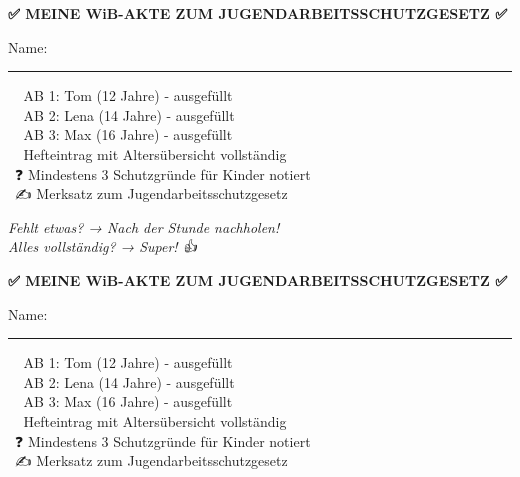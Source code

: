 \documentclass[12pt, a4paper]{article}
\newcommand{\checkbox}{\framebox[1em]{\phantom{X}}}
\begin{document}
    
    \begin{center}
        \begin{minipage}{0.48\textwidth}
            \begin{framed}
                \begin{center}
                    {\color{headercolor}\Large\textbf{✅ MEINE WiB-AKTE ZUM JUGENDARBEITSSCHUTZGESETZ ✅}}
                \end{center}
Name: \rule{8cm}{0.4pt}
                
                \vspace{0.3cm}
                
                \checkbox\ 📄 AB 1: Tom (12 Jahre) - ausgefüllt\\
                \checkbox\ 📄 AB 2: Lena (14 Jahre) - ausgefüllt\\
                \checkbox\ 📄 AB 3: Max (16 Jahre) - ausgefüllt\\
                \checkbox\ 📝 Hefteintrag mit Altersübersicht vollständig\\
                \checkbox\ ❓ Mindestens 3 Schutzgründe für Kinder notiert\\
                \checkbox\ ✍️ Merksatz zum Jugendarbeitsschutzgesetz
                
                \vspace{0.3cm}
                
                \textit{Fehlt etwas? → Nach der Stunde nachholen!}\\
                \textit{Alles vollständig? → Super! 👍}
            \end{framed}
        \end{minipage}
        \hfill
        \begin{minipage}{0.48\textwidth}
            \begin{framed}
                \begin{center}
                    {\color{headercolor}\Large\textbf{✅ MEINE WiB-AKTE ZUM JUGENDARBEITSSCHUTZGESETZ ✅}}
                \end{center}
                
                Name: \rule{8cm}{0.4pt}
                
                \vspace{0.3cm}
                
                \checkbox\ 📄 AB 1: Tom (12 Jahre) - ausgefüllt\\
                \checkbox\ 📄 AB 2: Lena (14 Jahre) - ausgefüllt\\
                \checkbox\ 📄 AB 3: Max (16 Jahre) - ausgefüllt\\
                \checkbox\ 📝 Hefteintrag mit Altersübersicht vollständig\\
                \checkbox\ ❓ Mindestens 3 Schutzgründe für Kinder notiert\\
                \checkbox\ ✍️ Merksatz zum Jugendarbeitsschutzgesetz
                

\end{framed}
\end{minipage}
\end{center}
\end{document}
